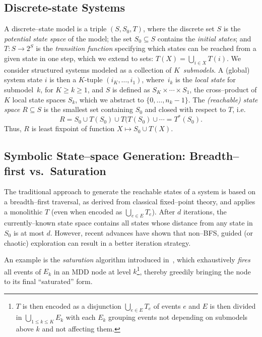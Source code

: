 \documentclass[nocover]             %
{NASA}                       %
\begin{document}
\subsection{Discrete-state Systems}\label{sec:DSS}

A discrete--state model is a triple $(S,S_0,T)$, where
the discrete set $S$ is the \emph{potential state space} of the model;
the set $S_0\subseteq S$ contains the \emph{initial states};
and $T : S\rightarrow 2^{S}$ is the \emph{transition function}
specifying which states can be reached from a given state in one step, 
which we extend to sets: $T(X) = \bigcup_{i\in X}T(i)$.
We consider structured systems modeled as a collection of $K$~\emph{submodels}.
A (global) system state $i$ is then a $K$-tuple $(i_{K},\ldots,i_{1})$,
where~$i_{k}$ is the \emph{local state} for submodel~$k$,
for $K \!\geq\! k\! \geq\! 1$, and
$S$ is defined as $ S_K \times \cdots \times  S_{1}$,
the cross--product of $K$ local state spaces $ S_k$,
which we abstract to $\{0,\ldots,n_k\!-\!1\}$.
The \emph{(reachable) state space} $R \subseteq S$ is the
smallest set containing $S_0$ and closed with respect to $T$,
i.e.
$$R = S_0 \cup T(S_0) \cup
T(T(S_0) \cup \cdots = T^{\ast}(S_0).$$
Thus, $R$ is least fixpoint of function $X \mapsto S_0 \cup T(X)$.

\subsection{Symbolic State--space Generation: Breadth--first vs.\ Saturation}

The traditional approach to generate the reachable states of
a system is based on a breadth--first traversal, as derived from
classical fixed--point theory, and applies a monolithic $T$
(even when encoded as $\bigcup_{e\in E}T_e$).
After $d$ iterations, the currently--known state space contains
all states whose distance from any state in $S_0$ is at most $d$.
However, recent advances have shown that non--BFS, guided (or chaotic)
exploration can result in a better iteration strategy.

An example is the \emph{saturation} algorithm introduced 
in~\cite{Saturation2001}, which exhaustively \emph{fires} all events of 
$ E_k$ in an MDD node at level $k$\footnote{$T$ is then encoded as a 
disjunction $\bigcup_{e\in E}T_e$ of events $e$ and $E$ is then divided 
in $\bigcup_{1 \leq k \leq K}E_k$ with each $E_k$ grouping events not 
depending on submodels above $k$ and not affecting them.}, thereby 
greedily bringing the node to its final ``saturated'' form.
\end{document}
